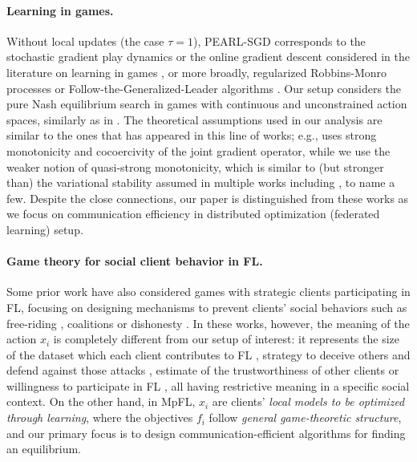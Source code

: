 \documentclass{article}
\newcommand{\algname}[1]{{\color{PineGreen}\sf  #1}\xspace}
\theoremstyle{plain}
\theoremstyle{remark}
\begin{document}
\paragraph{Learning in games.} 
Without local updates (the case $\tau=1$), \algname{PEARL-SGD} corresponds to the stochastic gradient play dynamics or the online gradient descent considered in the literature on learning in games \citep{mazumdar2020gradient, lin2020finite, hsieh2021limits}, or more broadly, regularized Robbins-Monro processes or Follow-the-Generalized-Leader algorithms \citep{mertikopoulos2024unified, giannou2021rate}. 
Our setup considers the pure Nash equilibrium search in games with continuous and unconstrained action spaces, similarly as in \cite{lin2020finite}.
The theoretical assumptions used in our analysis are similar to the ones that has appeared in this line of works; e.g., \cite{lin2020finite} uses strong monotonicity and cocoercivity of the joint gradient operator, while we use the weaker notion of quasi-strong monotonicity, which is similar to (but stronger than) the variational stability assumed in multiple works including \citep{bravo2018bandit, mertikopoulos2019learning, mertikopoulos2024unified}, to name a few.
Despite the close connections, our paper is distinguished from these works as we focus on communication efficiency in distributed optimization (federated learning) setup.

\paragraph{Game theory for social client behavior in FL.}
Some prior work have also considered games with strategic clients participating in FL, focusing on designing mechanisms to prevent clients' social behaviors such as free-riding \citep{murhekar2023incentives}, coalitions \cite{DonahueKleinberg2021_modelsharing} or dishonesty \citep{dorner2023incentivizing}.
In these works, however, the meaning of the action $x_i$ is completely different from our setup of interest: it represents the size of the dataset which each client contributes to FL \cite{blum2021one, karimireddy2022mechanisms, murhekar2023incentives}, strategy to deceive others and defend against those attacks \cite{dorner2023incentivizing}, estimate of the trustworthiness of other clients \cite{arisdakessian2023coalitional} or willingness to participate in FL \cite{capitaine2024unravelling}, all having restrictive meaning in a specific social context.
On the other hand, in MpFL, $x_i$ are clients' \textit{local models to be optimized through learning}, where the objectives $f_i$ follow \textit{general game-theoretic structure}, and our primary focus is to design communication-efficient algorithms for finding an equilibrium.
\end{document}

